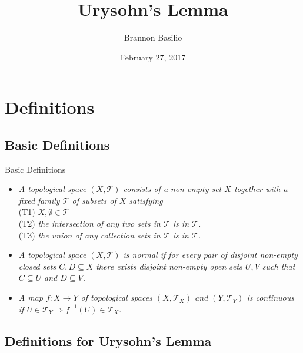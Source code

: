 \documentclass{beamer}
\title{Urysohn's Lemma}
\author{Brannon Basilio}
\institute[University of Hawaii] %
{
	University of Hawaii
}
\date{February 27, 2017}
\begin{document}
\begin{frame}
  \titlepage
\end{frame}



\section{Definitions}

\subsection{Basic Definitions}

\begin{frame}{Basic Definitions}
  \begin{itemize}
  \item {
    \textit{A topological space $(X, \mathcal{T})$ consists of a non-empty set $X$ together with a fixed family $\mathcal{T}$ of subsets of $X$ satisfying}\\
		(T1) \quad $X, \emptyset \in \mathcal{T}$\\
		(T2) \quad \textit{the intersection of any two sets in $\mathcal{T}$ is in $\mathcal{T}$.}\\
		(T3) \quad \textit{the union of any collection sets in $\mathcal{T}$ is in $\mathcal{T}$.}\\
  \pause
  }
  \item {
    \textit{A topological space $(X, \mathcal{T})$ is normal if for every pair of disjoint non-empty closed sets $C, D \subseteq X$ there exists disjoint non-empty open sets $U, V$ such that $C \subseteq U$ and $D \subseteq V$.}
    \pause
  }
  \item {\textit{A map $f : X \rightarrow Y$ of topological spaces $(X, \mathcal{T}_X)$ and $(Y, \mathcal{T}_Y)$ is continuous if $U \in \mathcal{T}_Y \Rightarrow f^{-1}(U) \in \mathcal{T}_X$}.}
  \end{itemize}
\end{frame}

\subsection{Definitions for Urysohn's Lemma}
\end{document}
